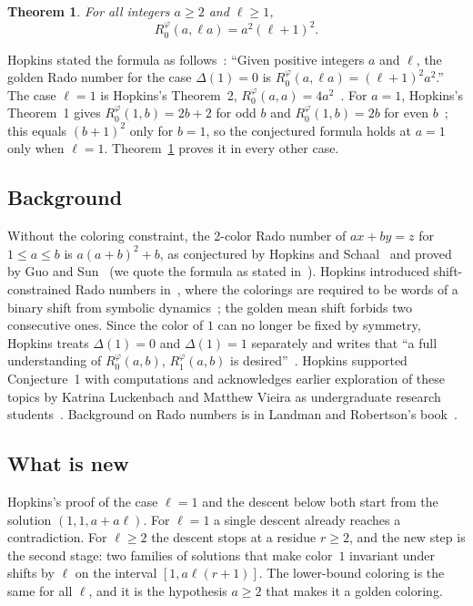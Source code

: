 \documentclass[11pt]{article}
\newtheorem{theorem}{Theorem}
\theoremstyle{remark}
\newcommand{\Rg}{R_0^{\varphi}}
\begin{document}
\begin{theorem}\label{thm:main}
For all integers $a\ge2$ and $\ell\ge1$,
\[
\Rg(a,\ell a)=a^2(\ell+1)^2 .
\]
\end{theorem}

Hopkins stated the formula as follows~\cite[Conjecture~1]{Hopkins}:
``Given positive integers $a$ and $\ell$, the golden Rado number for the
case $\Delta(1)=0$ is $\Rg(a,\ell a)=(\ell+1)^2a^2$.'' The case $\ell=1$
is Hopkins's Theorem~2, $\Rg(a,a)=4a^2$~\cite[Theorem~2]{Hopkins}.
For $a=1$, Hopkins's Theorem~1 gives $\Rg(1,b)=2b+2$ for odd $b$ and
$\Rg(1,b)=2b$ for even $b$~\cite[Theorem~1]{Hopkins}; this equals
$(b+1)^2$ only for $b=1$, so the conjectured formula holds at $a=1$ only
when $\ell=1$. Theorem~\ref{thm:main} proves it in every other case.

\subsection{Background}
Without the coloring constraint, the 2-color Rado number of $ax+by=z$
for $1\le a\le b$ is $a(a+b)^2+b$, as conjectured by Hopkins and
Schaal~\cite{HopkinsSchaal} and proved by Guo and Sun~\cite{GuoSun} (we
quote the formula as stated in~\cite[equation~(1)]{Hopkins}). Hopkins
introduced shift-constrained Rado numbers in~\cite{Hopkins}, where the
colorings are required to be words of a binary shift from symbolic
dynamics~\cite{LindMarcus}; the golden mean shift forbids two
consecutive ones. Since the color of $1$ can no longer be fixed by
symmetry, Hopkins treats $\Delta(1)=0$ and $\Delta(1)=1$ separately and
writes that ``a full understanding of $R_0^\varphi(a,b)$,
$R_1^\varphi(a,b)$ is desired''~\cite[Section~5]{Hopkins}. Hopkins
supported Conjecture~1 with computations and acknowledges earlier
exploration of these topics by Katrina Luckenbach and Matthew Vieira as
undergraduate research students~\cite[p.~13]{Hopkins}. Background on
Rado numbers is in Landman and Robertson's book~\cite[Chapter~9]{LR}.

\subsection{What is new}
Hopkins's proof of the case $\ell=1$ and the descent below both start
from the solution $(1,1,a+a\ell)$. For $\ell=1$ a single descent
already reaches a contradiction. For $\ell\ge2$ the descent stops at a
residue $r\ge2$, and the new step is the second stage: two families of
solutions that make color~$1$ invariant under shifts by $\ell$ on the
interval $[1,a\ell(r+1)]$. The lower-bound coloring is the same for all
$\ell$, and it is the hypothesis $a\ge2$ that makes it a golden
coloring.
\end{document}
